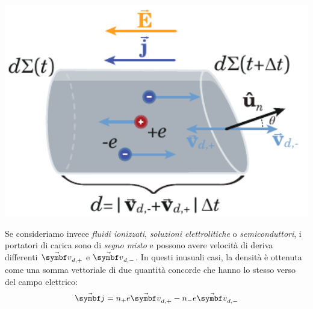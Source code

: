 \begin{minipage}{0.34\textwidth}
	\begin{center}
		\includegraphics[width=1\textwidth]{images/chp5/chp5correntecavo3.pdf}
	\end{center}
\end{minipage}\hspace{5pt}
\begin{minipage}{0.65\textwidth}
	Se consideriamo invece \textit{fluidi ionizzati}, \textit{soluzioni elettrolitiche} o \textit{semiconduttori}, i portatori di carica sono di \textit{segno misto} e possono avere velocità di deriva differenti $\vba{v}_{d,+}$ e $\vba{v}_{d,-}$. In questi inusuali casi, la densità è ottenuta come una somma vettoriale di due quantità concorde che hanno lo stesso verso del campo elettrico:
	\begin{equation}
		\vba{j}=n_{+}e\vba{v}_{d,+}-n_{-}e\vba{v}_{d,-}
	\end{equation}
\end{minipage}
